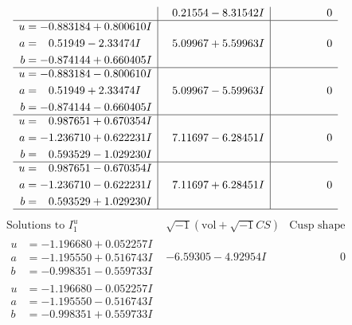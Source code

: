 \documentclass[1p]{elsarticle_modified}
\theoremstyle{definition}
\newcommand{\I}{\sqrt{-1}}
\begin{document}
$$\begin{array}{c|c|c}
 & \phantom{-}0.21554 - 8.31542 I & \phantom{-0.000000 } 0 \\ \hline\begin{aligned}
u &= -0.883184 + 0.800610 I \\
a &= \phantom{-}0.51949 - 2.33474 I \\
b &= -0.874144 + 0.660405 I\end{aligned}
 & \phantom{-}5.09967 + 5.59963 I & \phantom{-0.000000 } 0 \\ \hline\begin{aligned}
u &= -0.883184 - 0.800610 I \\
a &= \phantom{-}0.51949 + 2.33474 I \\
b &= -0.874144 - 0.660405 I\end{aligned}
 & \phantom{-}5.09967 - 5.59963 I & \phantom{-0.000000 } 0 \\ \hline\begin{aligned}
u &= \phantom{-}0.987651 + 0.670354 I \\
a &= -1.236710 + 0.622231 I \\
b &= \phantom{-}0.593529 - 1.029230 I\end{aligned}
 & \phantom{-}7.11697 - 6.28451 I & \phantom{-0.000000 } 0 \\ \hline\begin{aligned}
u &= \phantom{-}0.987651 - 0.670354 I \\
a &= -1.236710 - 0.622231 I \\
b &= \phantom{-}0.593529 + 1.029230 I\end{aligned}
 & \phantom{-}7.11697 + 6.28451 I & \phantom{-0.000000 } 0\\
 \hline 
 \end{array}$$\newpage$$\begin{array}{c|c|c}  
\text{Solutions to }I^u_{1}& \I (\text{vol} + \sqrt{-1}CS) & \text{Cusp shape}\\
 \hline 
\begin{aligned}
u &= -1.196680 + 0.052257 I \\
a &= -1.195550 + 0.516743 I \\
b &= -0.998351 - 0.559733 I\end{aligned}
 & -6.59305 - 4.92954 I & \phantom{-0.000000 } 0 \\ \hline\begin{aligned}
u &= -1.196680 - 0.052257 I \\
a &= -1.195550 - 0.516743 I \\
b &= -0.998351 + 0.559733 I\end{aligned}

\end{array}$$
\end{document}
